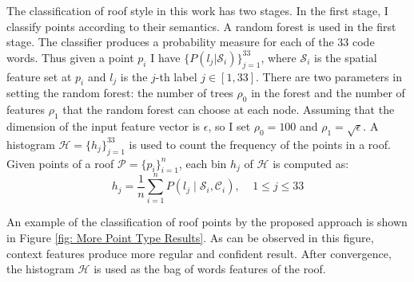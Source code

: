 \documentclass{iitthesis}
\begin{document}
The classification of roof style in this work has two stages. In the first stage, I classify points according to their semantics. A random forest is used in the first stage. The classifier produces a probability measure for each of the 33 code words. Thus given a point $p_i$ I have $\{ P({l_j \vert \mathcal{S}_i }) \}_{j=1}^{33}$, where $\mathcal{S}_i$ is the spatial feature set at $p_i$ and $l_j$ is the $j$-th label $j\in[1, 33]$. There are two parameters in setting the random forest: the number of trees $\rho_0$ in the forest and the number of features $\rho_1$ that the random forest can choose at each node. Assuming that the dimension of the input feature vector is $\epsilon$, so I set $\rho_0=100$ and $\rho_1=\sqrt{\epsilon}$. A histogram $\mathcal{H}=\{h_j\}_{j=1}^{33}$ is used to count the frequency of the points in a roof. Given points of a roof $ \mathcal{P}= \{p_i\}_{i=1}^n $, each bin $h_j$ of $\mathcal{H}$ is computed as:
\begin{equation}
h_j=\frac{1}{n}\sum\limits^n_{i=1}{P{(l_j\;\vert \;\mathcal{S}_i, \mathcal{C}_i)}}, \;\;\;\; 1\leq j \leq 33
\end{equation}

An example of the classification of roof points by the proposed approach is shown in Figure \ref{fig: More Point Type Results}. As can be observed in this figure, context features produce more regular and confident result. After convergence, the histogram $\mathcal{H}$ is used as the bag of words features of the roof.
\end{document}
